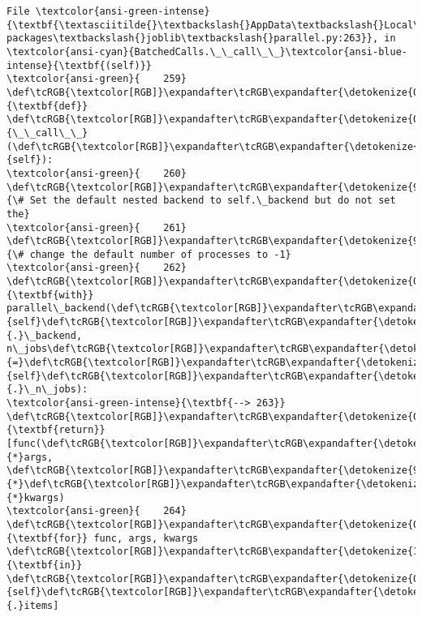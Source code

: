 \documentclass[11pt]{article}
\begin{document}
\begin{Verbatim}[commandchars=\\\{\}, frame=single, framerule=2mm, rulecolor=\color{outerrorbackground}]
File \textcolor{ansi-green-intense}{\textbf{\textasciitilde{}\textbackslash{}AppData\textbackslash{}Local\textbackslash{}anaconda3\textbackslash{}lib\textbackslash{}site-packages\textbackslash{}joblib\textbackslash{}parallel.py:263}}, in \textcolor{ansi-cyan}{BatchedCalls.\_\_call\_\_}\textcolor{ansi-blue-intense}{\textbf{(self)}}
\textcolor{ansi-green}{    259} \def\tcRGB{\textcolor[RGB]}\expandafter\tcRGB\expandafter{\detokenize{0,135,0}}{\textbf{def}} \def\tcRGB{\textcolor[RGB]}\expandafter\tcRGB\expandafter{\detokenize{0,0,255}}{\_\_call\_\_}(\def\tcRGB{\textcolor[RGB]}\expandafter\tcRGB\expandafter{\detokenize{0,135,0}}{self}):
\textcolor{ansi-green}{    260}     \def\tcRGB{\textcolor[RGB]}\expandafter\tcRGB\expandafter{\detokenize{95,135,135}}{\# Set the default nested backend to self.\_backend but do not set the}
\textcolor{ansi-green}{    261}     \def\tcRGB{\textcolor[RGB]}\expandafter\tcRGB\expandafter{\detokenize{95,135,135}}{\# change the default number of processes to -1}
\textcolor{ansi-green}{    262}     \def\tcRGB{\textcolor[RGB]}\expandafter\tcRGB\expandafter{\detokenize{0,135,0}}{\textbf{with}} parallel\_backend(\def\tcRGB{\textcolor[RGB]}\expandafter\tcRGB\expandafter{\detokenize{0,135,0}}{self}\def\tcRGB{\textcolor[RGB]}\expandafter\tcRGB\expandafter{\detokenize{98,98,98}}{.}\_backend, n\_jobs\def\tcRGB{\textcolor[RGB]}\expandafter\tcRGB\expandafter{\detokenize{98,98,98}}{=}\def\tcRGB{\textcolor[RGB]}\expandafter\tcRGB\expandafter{\detokenize{0,135,0}}{self}\def\tcRGB{\textcolor[RGB]}\expandafter\tcRGB\expandafter{\detokenize{98,98,98}}{.}\_n\_jobs):
\textcolor{ansi-green-intense}{\textbf{--> 263}}         \def\tcRGB{\textcolor[RGB]}\expandafter\tcRGB\expandafter{\detokenize{0,135,0}}{\textbf{return}} [func(\def\tcRGB{\textcolor[RGB]}\expandafter\tcRGB\expandafter{\detokenize{98,98,98}}{*}args, \def\tcRGB{\textcolor[RGB]}\expandafter\tcRGB\expandafter{\detokenize{98,98,98}}{*}\def\tcRGB{\textcolor[RGB]}\expandafter\tcRGB\expandafter{\detokenize{98,98,98}}{*}kwargs)
\textcolor{ansi-green}{    264}                 \def\tcRGB{\textcolor[RGB]}\expandafter\tcRGB\expandafter{\detokenize{0,135,0}}{\textbf{for}} func, args, kwargs \def\tcRGB{\textcolor[RGB]}\expandafter\tcRGB\expandafter{\detokenize{175,0,255}}{\textbf{in}} \def\tcRGB{\textcolor[RGB]}\expandafter\tcRGB\expandafter{\detokenize{0,135,0}}{self}\def\tcRGB{\textcolor[RGB]}\expandafter\tcRGB\expandafter{\detokenize{98,98,98}}{.}items]


\end{Verbatim}
\end{document}
